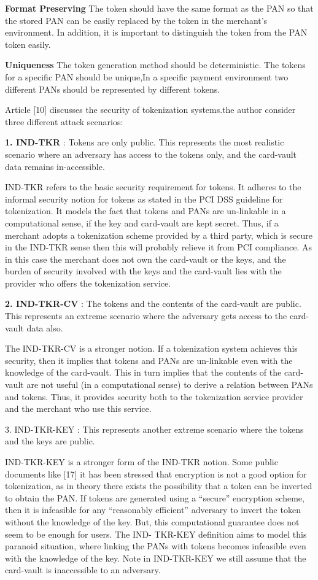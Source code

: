 \documentclass[journal]{IEEEtran}
\begin{document}
\textbf{Format Preserving}
The token should have the same format as the PAN so that the stored PAN can be easily replaced by the token in the merchant's environment. In addition, it is important to distinguish the token from the PAN token easily.

\textbf{Uniqueness}
The token generation method should be deterministic. The tokens for a specific PAN should be unique,In a specific payment environment two different PANs should be represented by different tokens.

Article [10] discusses the security of tokenization systems.the author consider three different attack scenarios: 

\textbf{1. IND-TKR }: Tokens are only public. This represents the most realistic scenario where an adversary has
access to the tokens only, and the card-vault data remains in-accessible.

IND-TKR refers to the basic security requirement for tokens. It adheres to the informal security notion for tokens as stated in the PCI DSS guideline for tokenization. It models the fact that tokens and PANs are un-linkable in a computational sense, if the key and card-vault are kept secret. Thus, if a merchant adopts a tokenization scheme provided by a third party, which is secure in the IND-TKR sense then this will probably relieve it from PCI compliance. As in this case the merchant does not own the card-vault or the keys, and the burden of security involved with the keys and the card-vault lies with the provider who offers the tokenization service.

\textbf{2. IND-TKR-CV }: The tokens and the contents of the card-vault are public. This represents an extreme scenario where the adversary gets access to the card-vault data also.

The IND-TKR-CV is a stronger notion. If a tokenization system achieves this security, then it implies that tokens and PANs are un-linkable even with the knowledge of the card-vault. This in turn implies that the contents of the card-vault are not useful (in a computational sense) to derive a relation between PANs and tokens. Thus, it provides security both to the tokenization service provider and the merchant who use this service.

3. IND-TKR-KEY : This represents another extreme scenario where the tokens and the keys are public.

IND-TKR-KEY is a stronger form of the IND-TKR notion. Some public documents like [17] it has been stressed that encryption is not a good option for tokenization, as in theory there exists the possibility that a token can be inverted to obtain the PAN. If tokens are generated using a “secure” encryption scheme, then it is infeasible for any “reasonably efficient” adversary to invert the token without the knowledge of the key. But, this computational guarantee does not seem to be enough for users. The IND-
TKR-KEY definition aims to model this paranoid situation, where linking the PANs with tokens becomes infeasible even with the knowledge of the key. Note in IND-TKR-KEY we still assume that the card-vault is inaccessible to an adversary.
\\
\end{document}
